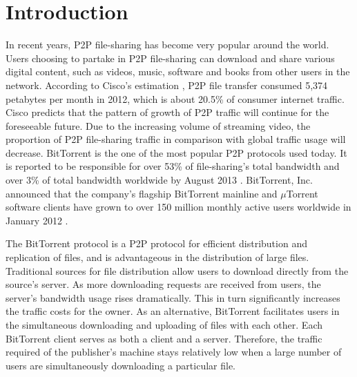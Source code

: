 \documentclass[conference]{IEEEtran}
\begin{document}
\section{Introduction}
In recent years, P2P file-sharing has become very popular around the world. Users choosing to partake in P2P file-sharing can download and share various digital content, such as videos, music, software and books from other users in the network. According to Cisco's estimation \cite{cisco}, P2P file transfer consumed 5,374 petabytes per month in 2012, which is about 20.5\% of consumer internet traffic. Cisco predicts that the pattern of growth of P2P traffic will continue for the foreseeable future. Due to the increasing volume of streaming video, the proportion of P2P file-sharing traffic in comparison with global traffic usage will decrease. BitTorrent is the one of the most popular P2P protocols used today. It is reported to be responsible for over 53\% of file-sharing's total bandwidth and over 3\% of total bandwidth worldwide by August 2013 \cite{paloalto}. BitTorrent, Inc. announced that the company's flagship BitTorrent mainline and $\mu$Torrent software clients have grown to over 150 million monthly active users worldwide in January 2012 \cite{bt}.

The BitTorrent protocol \cite{btspec} is a P2P protocol for efficient distribution and replication of files, and is advantageous in the distribution of large files. Traditional sources for file distribution allow users to download directly from the source's server. As more downloading requests are received from users, the server's bandwidth usage rises dramatically. This in turn significantly increases the traffic costs for the owner. As an alternative, BitTorrent facilitates users in the simultaneous downloading and uploading of files with each other. Each BitTorrent client serves as both a client and a server. Therefore, the traffic required of the publisher's machine stays relatively low when a large number of users are simultaneously downloading a particular file. 
\end{document}
